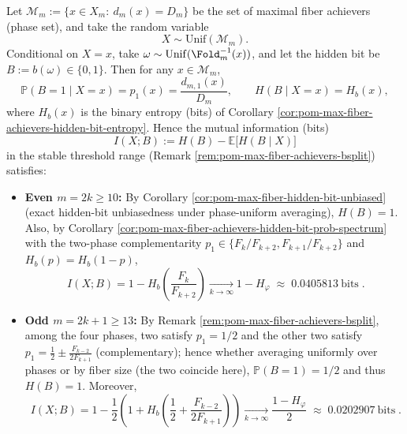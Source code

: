 \begin{corollary}\label{cor:pom-max-fiber-phase-hidden-bit-mi}
Let \(\mathcal{M}_m:=\{x\in X_m:\ d_m(x)=D_m\}\) be the set of maximal fiber achievers (phase set), and take the random variable
\[
X\sim\mathrm{Unif}(\mathcal{M}_m).
\]
Conditional on \(X=x\), take
\(
\omega\sim\mathrm{Unif}(\Fold_m^{-1}(x))
\), and let the hidden bit be \(B:=b(\omega)\in\{0,1\}\).
Then for any \(x\in\mathcal{M}_m\),
\[
\mathbb{P}(B=1\mid X=x)=p_1(x)=\frac{d_{m,1}(x)}{D_m},
\qquad
H(B\mid X=x)=H_b(x),
\]
where \(H_b(x)\) is the binary entropy (bits) of Corollary \ref{cor:pom-max-fiber-achievers-hidden-bit-entropy}.
Hence the mutual information (bits)
\[
I(X;B):=H(B)-\mathbb{E}\!\bigl[H(B\mid X)\bigr]
\]
in the stable threshold range (Remark \ref{rem:pom-max-fiber-achievers-bsplit}) satisfies:
\begin{itemize}
  \item \textbf{Even \(m=2k\ge 10\):} By Corollary \ref{cor:pom-max-fiber-hidden-bit-unbiased} (exact hidden-bit unbiasedness under phase-uniform averaging), \(H(B)=1\).
  Also, by Corollary \ref{cor:pom-max-fiber-achievers-hidden-bit-prob-spectrum} with the two-phase complementarity \(p_1\in\{F_k/F_{k+2},F_{k+1}/F_{k+2}\}\) and \(H_b(p)=H_b(1-p)\),
  \[
  \boxed{\;
  I(X;B)=1-H_b\!\left(\frac{F_k}{F_{k+2}}\right)
  \xrightarrow[k\to\infty]{}
  1-H_\varphi\;\approx\;0.0405813\ \mathrm{bits}\; }.
  \]
  \item \textbf{Odd \(m=2k+1\ge 13\):} By Remark \ref{rem:pom-max-fiber-achievers-bsplit}, among the four phases, two satisfy \(p_1=1/2\) and the other two satisfy \(p_1=\tfrac12\pm \tfrac{F_{k-2}}{2F_{k+1}}\) (complementary); hence whether averaging uniformly over phases or by fiber size (the two coincide here), \(\mathbb{P}(B=1)=1/2\) and thus \(H(B)=1\).
  Moreover,
  \[
  \boxed{\;
  I(X;B)=1-\frac{1}{2}\left(1+H_b\!\left(\frac12+\frac{F_{k-2}}{2F_{k+1}}\right)\right)
  \xrightarrow[k\to\infty]{}
  \frac{1-H_\varphi}{2}\;\approx\;0.0202907\ \mathrm{bits}\; }.
  \]
\end{itemize}
\end{corollary}

